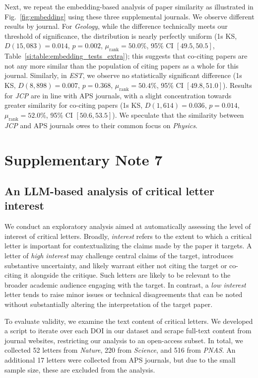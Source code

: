 \documentclass[12pt]{article} %
\begin{document}
Next, we repeat the embedding-based analysis of paper similarity as illustrated in Fig.~\ref{fig:embedding} using these three supplemental journals.
We observe different results by journal.
For \textit{Geology}, while the difference technically meets our threshold of significance, the distribution is nearly perfectly uniform (1s KS, $D(15{,}083) = 0.014$, $p = 0.002$, $\mu_{\text{rank}} = 50.0\%$, 95\% CI $[49.5, 50.5]$, Table~\ref{si:table:embedding_tests_extra}); this suggests that co-citing papers are not any more similar than the population of citing papers as a whole for this journal.
Similarly, in \textit{EST}, we observe no statistically significant difference (1s KS, $D(8{,}898) = 0.007$, $p = 0.368$, $\mu_{\text{rank}} = 50.4\%$, 95\% CI $[49.8, 51.0]$).
Results for \textit{JCP} are in line with APS journals, with a slight concentration towards greater similarity for co-citing papers (1s KS, $D(1{,}614) = 0.036$, $p = 0.014$, $\mu_{\text{rank}} = 52.0\%$, 95\% CI $[50.6, 53.5]$).
We speculate that the similarity between \textit{JCP} and APS journals owes to their common focus on \textit{Physics}.


\section*{Supplementary Note 7}
\label{si:text:llm-analysis}
\subsection*{An LLM-based analysis of critical letter interest}

We conduct an exploratory analysis aimed at automatically assessing the level of interest of critical letters. 
Broadly, \textit{interest} refers to the extent to which a critical letter is important for contextualizing the claims made by the paper it targets. 
A letter of \textit{high interest} may challenge central claims of the target, introduces substantive uncertainty, and likely warrant either not citing the target or co-citing it alongside the critique. 
Such letters are likely to be relevant to the broader academic audience engaging with the target. 
In contrast, a \textit{low interest} letter tends to raise minor issues or technical disagreements that can be noted without substantially altering the interpretation of the target paper.

To evaluate validity, we examine the text content of critical letters. 
We developed a script to iterate over each DOI in our dataset and scrape full-text content from journal websites, restricting our analysis to an open-access subset. In total, we collected 52 letters from \textit{Nature}, 220 from \textit{Science}, and 516 from \textit{PNAS}. 
An additional 17 letters were collected from APS journals, but due to the small sample size, these are excluded from the analysis.
\end{document}

